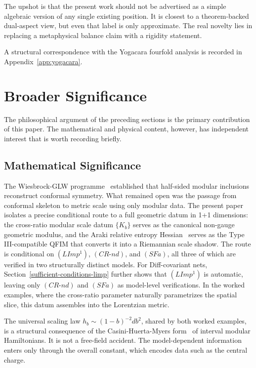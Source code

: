 \documentclass[12pt]{article}
\theoremstyle{definition}
\theoremstyle{remark}
\begin{document}
The upshot is that the present work should not be advertised as a simple
algebraic version of any single existing position. It is closest to a
theorem-backed dual-aspect view, but even that label is only
approximate. The real novelty lies in replacing a metaphysical balance
claim with a rigidity statement.

A structural correspondence with the Yogacara fourfold analysis is
recorded in Appendix~\ref{app:yogacara}.

\section{Broader Significance}\label{broader-significance}

The philosophical argument of the preceding sections is the primary
contribution of this paper. The mathematical and physical content,
however, has independent interest that is worth recording briefly.

\subsection{Mathematical Significance}\label{mathematical-significance}

The Wiesbrock-GLW programme~\cite{Wiesbrock1993,GLW1998} established that half-sided modular
inclusions reconstruct conformal symmetry. What remained open was the
passage from conformal skeleton to metric scale using only modular data.
The present paper isolates a precise conditional route to a full
geometric datum in 1+1 dimensions: the cross-ratio modular scale datum
\(\{K_b\}\) serves as the canonical non-gauge geometric modulus, and the
Araki relative entropy Hessian~\cite{Araki1976} serves as the Type III-compatible
QFIM that converts it into a Riemannian scale shadow. The route is
conditional on \((LImp^1)\), \((CR\text{-}nd)\), and \((SFa)\), all
three of which are verified in two structurally distinct models.
For Diff-covariant nets, Section~\ref{sufficient-conditions-limp}
further shows that \((LImp^1)\) is automatic, leaving only
\((CR\text{-}nd)\) and \((SFa)\) as model-level verifications.
In the
worked examples, where the cross-ratio parameter naturally parametrizes
the spatial slice, this datum assembles into the Lorentzian metric.

The universal scaling law \(h_b \sim (1-b)^{-2}db^2\), shared by both
worked examples, is a structural consequence of the Casini-Huerta-Myers
form~\cite{CasiniHuertaMyers2011} of interval modular Hamiltonians. It is not a free-field accident.
The model-dependent information enters only through the overall
constant, which encodes data such as the central charge.
\end{document}
